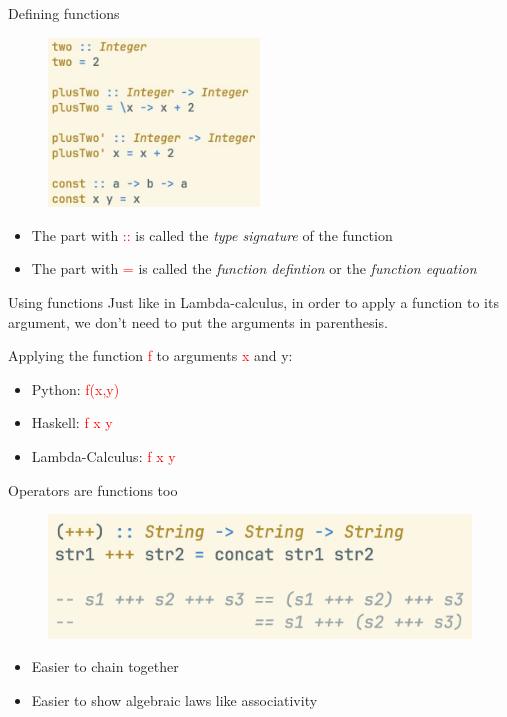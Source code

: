 \documentclass[pdf]{beamer}
\newcommand{\code}[1]{\textcolor{Red}{\textsf{#1}}}
\begin{document}
\begin{frame}{Defining functions}
  \begin{figure}[H]
    \centering
    \includegraphics[width=0.50\textwidth]{decls}
  \end{figure}
  \begin{itemize}
    \item The part with \code{::} is called the \emph{type signature} of the function
    \item The part with \code{=} is called the \emph{function defintion} or the \emph{function equation}
  \end{itemize}
\end{frame}

\begin{frame}{Using functions}
  Just like in Lambda-calculus, in order to apply a function to its argument, we don't need to put the arguments in parenthesis.

  Applying the function \code{f} to arguments \code{x} and {y}:
  \begin{itemize}
  \item Python: \code{f(x,y)}
  \item Haskell: \code{f x y}
  \item Lambda-Calculus: \code{f x y}
  \end{itemize}
\end{frame}

\begin{frame}{Operators are functions too}
  \begin{figure}[H]
    \centering
    \includegraphics[width=\textwidth]{concat-op}
  \end{figure}
  \begin{itemize}
  \item Easier to chain together
  \item Easier to show algebraic laws like associativity
  \end{itemize}
\end{frame}
\end{document}
